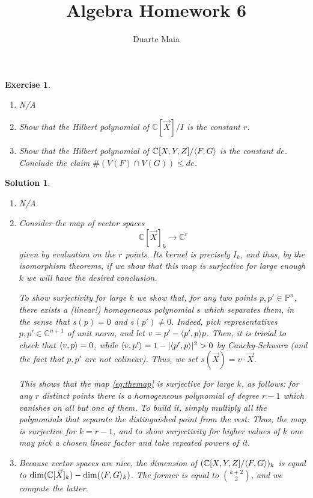 \documentclass{article}
\title{Algebra Homework 6}
\author{Duarte Maia}
\newtheorem{ex}{Exercise}
\theoremstyle{nonumberplain}
\newtheorem{sol}{Solution}
\newcommand{\C}{\mathbb{C}}
\newcommand{\PP}{\mathbb{P}}
\DeclarePairedDelimiter{\norm}{\lvert}{\rvert}
\DeclarePairedDelimiter{\braket}{\langle}{\rangle}
\begin{document}
\maketitle

\begin{ex}
\leavevmode
\begin{enumerate}
\item N/A
\item Show that the Hilbert polynomial of $\C[\vec X]/I$ is the constant $r$.
\item Show that the Hilbert polynomial of $\C[X,Y,Z]/\braket{F,G}$ is the constant $de$. Conclude the claim $\#(V(F) \cap V(G)) \leq de$.
\end{enumerate}
\end{ex}

\begin{sol}
\leavevmode
\begin{enumerate}
\item N/A
\item Consider the map of vector spaces
\begin{equation}\label{eq:themap}
\C[\vec X]_k \to \C^r
\end{equation}
given by evaluation on the $r$ points. Its kernel is precisely $I_k$, and thus, by the isomorphism theorems, if we show that this map is surjective for large enough $k$ we will have the desired conclusion.

To show surjectivity for large $k$ we show that, for any two points $p, p' \in \PP^n$, there exists a (linear!) homogeneous polynomial $s$ which separates them, in the sense that $s(p) = 0$ and $s(p') \neq 0$. Indeed, pick representatives $p,p' \in \C^{n+1}$ of unit norm, and let $v = p' - \braket{p',p}p$. Then, it is trivial to check that $\braket{v,p} = 0$, while $\braket{v,p'} = 1 - \norm{\braket{p',p}}^2 > 0$ by Cauchy-Schwarz (and the fact that $p,p'$ are not colinear). Thus, we set $s(\vec X) = v \cdot \vec X$.

This shows that the map \eqref{eq:themap} is surjective for large $k$, as follows: for any $r$ distinct points there is a homogeneous polynomial of degree $r-1$ which vanishes on all but one of them. To build it, simply multiply all the polynomials that separate the distinguished point from the rest. Thus, the map is surjective for $k=r-1$, and to show surjectivity for higher values of $k$ one may pick a chosen linear factor and take repeated powers of it.

\item Because vector spaces are nice, the dimension of $(\C[X,Y,Z]/\braket{F,G})_k$ is equal to $\dim(\C[\vec X]_k) - \dim(\braket{F,G}_k)$. The former is equal to $\binom{k+2}{2}$, and we compute the latter.


\end{enumerate}
\end{sol}
\end{document}
